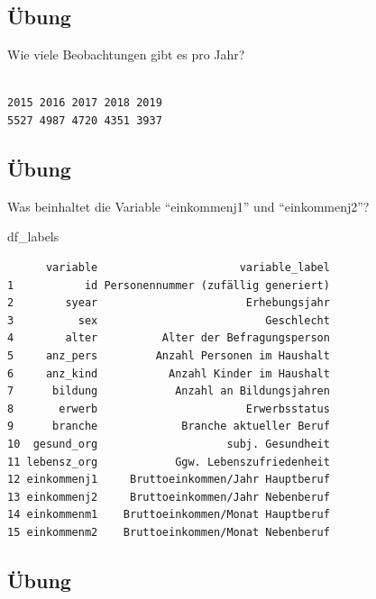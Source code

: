 \documentclass[
  letterpaper,
  DIV=11,
  numbers=noendperiod]{scrartcl}
\newenvironment{Shaded}{\begin{snugshade}}{\end{snugshade}}
\newcommand{\FunctionTok}[1]{\textcolor[rgb]{0.28,0.35,0.67}{#1}}
\newcommand{\NormalTok}[1]{\textcolor[rgb]{0.00,0.23,0.31}{#1}}
\newcommand{\SpecialCharTok}[1]{\textcolor[rgb]{0.37,0.37,0.37}{#1}}
\begin{document}
\subsection{Übung}\label{uxfcbung-4}

Wie viele Beobachtungen gibt es pro Jahr?

\begin{Shaded}
\end{Shaded}

\begin{verbatim}

2015 2016 2017 2018 2019 
5527 4987 4720 4351 3937 
\end{verbatim}

\subsection{Übung}\label{uxfcbung-5}

Was beinhaltet die Variable ``einkommenj1'' und ``einkommenj2''?

\begin{Shaded}
\begin{Highlighting}[]
\NormalTok{df\_labels}
\end{Highlighting}
\end{Shaded}

\begin{verbatim}
      variable                      variable_label
1           id Personennummer (zufällig generiert)
2        syear                       Erhebungsjahr
3          sex                          Geschlecht
4        alter          Alter der Befragungsperson
5     anz_pers         Anzahl Personen im Haushalt
6     anz_kind           Anzahl Kinder im Haushalt
7      bildung            Anzahl an Bildungsjahren
8       erwerb                       Erwerbsstatus
9      branche             Branche aktueller Beruf
10  gesund_org                    subj. Gesundheit
11 lebensz_org            Ggw. Lebenszufriedenheit
12 einkommenj1     Bruttoeinkommen/Jahr Hauptberuf
13 einkommenj2     Bruttoeinkommen/Jahr Nebenberuf
14 einkommenm1    Bruttoeinkommen/Monat Hauptberuf
15 einkommenm2    Bruttoeinkommen/Monat Nebenberuf
\end{verbatim}

\subsection{Übung}\label{uxfcbung-6}
\end{document}
